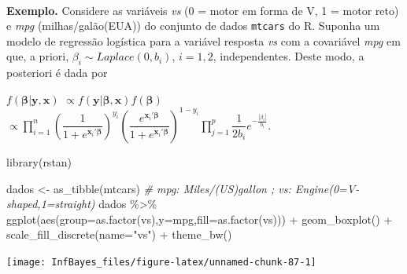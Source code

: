 \documentclass[
]{book}
\newenvironment{Shaded}{\begin{snugshade}}{\end{snugshade}}
\newcommand{\AttributeTok}[1]{\textcolor[rgb]{0.77,0.63,0.00}{#1}}
\newcommand{\CommentTok}[1]{\textcolor[rgb]{0.56,0.35,0.01}{\textit{#1}}}
\newcommand{\FunctionTok}[1]{\textcolor[rgb]{0.00,0.00,0.00}{#1}}
\newcommand{\NormalTok}[1]{#1}
\newcommand{\OtherTok}[1]{\textcolor[rgb]{0.56,0.35,0.01}{#1}}
\newcommand{\SpecialCharTok}[1]{\textcolor[rgb]{0.00,0.00,0.00}{#1}}
\newcommand{\StringTok}[1]{\textcolor[rgb]{0.31,0.60,0.02}{#1}}
\begin{document}
\(~\)

\textbf{Exemplo.} Considere as variáveis \emph{vs} (0 = motor em forma de V, 1 = motor reto) e \emph{mpg} (milhas/galão(EUA)) do conjunto de dados \texttt{mtcars} do R. Suponha um modelo de regressão logística para a variável resposta \emph{vs} com a covariável \emph{mpg} em que, a priori, \(\beta_i \sim \textit{Laplace}(0,b_i)\), \(i=1,2\), independentes. Deste modo, a posteriori é dada por

\(f(\boldsymbol\beta | \boldsymbol{y},\boldsymbol{x})\)
\(\propto f(\boldsymbol{y}|\boldsymbol\beta,\boldsymbol{x})f(\boldsymbol\beta)\)
\(\propto \displaystyle\prod_{i=1}^{n} \left(\dfrac{1}{1+e^{\boldsymbol x_i' \boldsymbol\beta}}\right)^{y_i}\left(\dfrac{e^{\boldsymbol x_i' \boldsymbol\beta}}{1+e^{\boldsymbol x_i' \boldsymbol\beta}}\right)^{1-y_i} \prod_{j=1}^{p} \dfrac{1}{2b_i} e^{-\frac{|\beta_i|}{b_i}}\).

\begin{Shaded}
\begin{Highlighting}[]
\FunctionTok{library}\NormalTok{(rstan)}

\NormalTok{dados }\OtherTok{\textless{}{-}} \FunctionTok{as\_tibble}\NormalTok{(mtcars)}
\CommentTok{\# mpg:  Miles/(US)gallon ;  vs: Engine(0=V{-}shaped,1=straight)}
\NormalTok{dados }\SpecialCharTok{\%\textgreater{}\%} \FunctionTok{ggplot}\NormalTok{(}\FunctionTok{aes}\NormalTok{(}\AttributeTok{group=}\FunctionTok{as.factor}\NormalTok{(vs),}\AttributeTok{y=}\NormalTok{mpg,}\AttributeTok{fill=}\FunctionTok{as.factor}\NormalTok{(vs))) }\SpecialCharTok{+}
        \FunctionTok{geom\_boxplot}\NormalTok{() }\SpecialCharTok{+} \FunctionTok{scale\_fill\_discrete}\NormalTok{(}\AttributeTok{name=}\StringTok{"vs"}\NormalTok{) }\SpecialCharTok{+} \FunctionTok{theme\_bw}\NormalTok{()}
\end{Highlighting}
\end{Shaded}

\begin{center}\texttt{[image: InfBayes\_files/figure-latex/unnamed-chunk-87-1]} \end{center}
\end{document}

